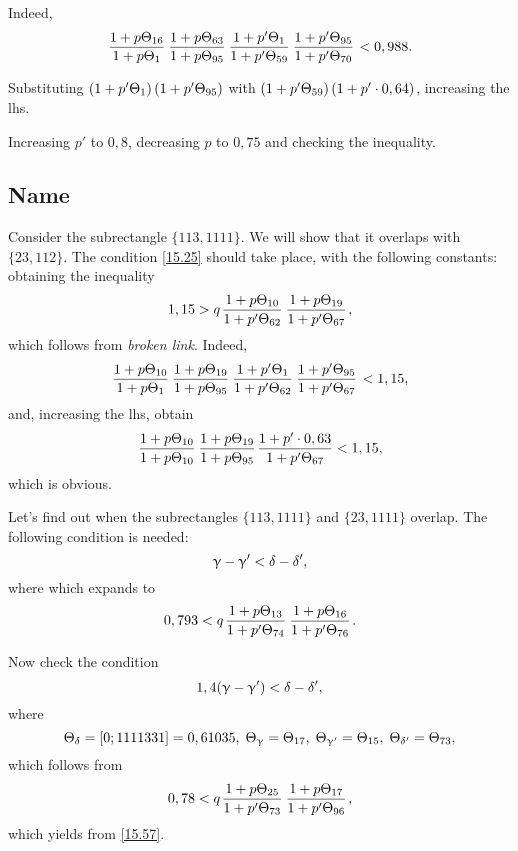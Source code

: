 Indeed,
\begin{equation*}
	\uu{16}{1} \uu{63}{95} \pp{1}{59} \pp{95}{70} < 0,988.
\end{equation*}

Substituting $\left(1 + p' \Theta_{1}\right)\left(1 + p' \Theta_{95}\right)$
with $\left(1 + p' \Theta_{59}\right)\left(1 + p' \cdot 0,64\right)$, increasing the lhs.

Increasing $p'$ to $0,8$, decreasing $p$ to $0,75$ and checking the inequality.

\subsection{Name}

Consider the subrectangle $\{113, 1111\}$.
We will show that it overlaps with $\{23, 112\}$.
The condition \ref{15.25} should take place, with the following constants:
obtaining the inequality
\begin{equation*}
	1,15 > q \up{10}{62} \up{19}{67},
\end{equation*}
which follows from \textit{broken link}.
Indeed,
\begin{equation*}
	\uu{10}{1} \uu{19}{95} \pp{1}{62} \pp{95}{67} < 1,15,
\end{equation*}
and, increasing the lhs, obtain
\begin{equation*}
	\uu{10}{10} \uu{19}{95} \dfrac{1 + p' \cdot 0,63}{1 + p' \T{67}} < 1,15,
\end{equation*}
which is obvious.

Let's find out when the subrectangles $\{113, 1111\}$ and $\{23, 1111\}$ overlap.
The following condition is needed:
\begin{equation*}
	\upgamma - \upgamma' < \delta - \delta',
\end{equation*}
where
which expands to
\begin{equation}\label{15.57}
	0,793 < q \up{13}{74} \up{16}{76}.
\end{equation}

Now check the condition
\begin{equation*}
	1,4 (\upgamma - \upgamma') < \delta - \delta',
\end{equation*}
where
\begin{equation*}
	\Theta_{\delta} = [0; 1111331] = 0,61035,\;
	\Theta_{\upgamma} = \Theta_{17},\;
	\Theta_{\upgamma'} = \Theta_{15},\;
	\Theta_{\delta'} = \Theta_{73},
\end{equation*}
which follows from
\begin{equation*}
	0,78 < q \up{25}{73} \up{17}{96},
\end{equation*}
which yields from \ref{15.57}.

